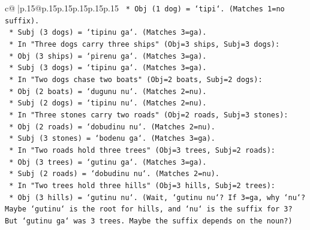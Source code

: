 \documentclass{article}
\begin{document}
{\begin{supertabular}{c@{$\;$}|p{.15\linewidth}@{}p{.15\linewidth}p{.15\linewidth}p{.15\linewidth}p{.15\linewidth}p{.15\linewidth}}
{{{\texttt{                                                    *   Obj (1 dog) = `tipi`. (Matches 1=no suffix).} \\
\texttt{                                                    *   Subj (3 dogs) = `tipinu ga`. (Matches 3=ga).} \\
\texttt{                                                *   In "Three dogs carry three ships" (Obj=3 ships, Subj=3 dogs):} \\
\texttt{                                                    *   Obj (3 ships) = `pirenu ga`. (Matches 3=ga).} \\
\texttt{                                                    *   Subj (3 dogs) = `tipinu ga`. (Matches 3=ga).} \\
\texttt{                                                *   In "Two dogs chase two boats" (Obj=2 boats, Subj=2 dogs):} \\
\texttt{                                                    *   Obj (2 boats) = `dugunu nu`. (Matches 2=nu).} \\
\texttt{                                                    *   Subj (2 dogs) = `tipinu nu`. (Matches 2=nu).} \\
\texttt{                                                *   In "Three stones carry two roads" (Obj=2 roads, Subj=3 stones):} \\
\texttt{                                                    *   Obj (2 roads) = `dobudinu nu`. (Matches 2=nu).} \\
\texttt{                                                    *   Subj (3 stones) = `bodenu ga`. (Matches 3=ga).} \\
\texttt{                                                *   In "Two roads hold three trees" (Obj=3 trees, Subj=2 roads):} \\
\texttt{                                                    *   Obj (3 trees) = `gutinu ga`. (Matches 3=ga).} \\
\texttt{                                                    *   Subj (2 roads) = `dobudinu nu`. (Matches 2=nu).} \\
\texttt{                                                *   In "Two trees hold three hills" (Obj=3 hills, Subj=2 trees):} \\
\texttt{                                                    *   Obj (3 hills) = `gutinu nu`. (Wait, `gutinu nu`? If 3=ga, why `nu`? Maybe `gutinu` is the root for hills, and `nu` is the suffix for 3? But `gutinu ga` was 3 trees. Maybe the suffix depends on the noun?)} \\
}}}
\end{supertabular}}
\end{document}
